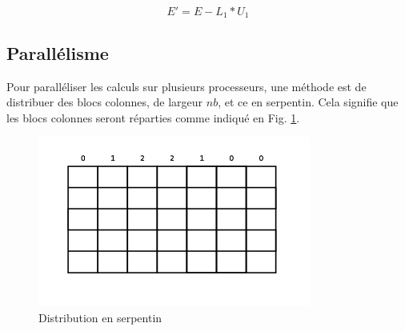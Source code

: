 \begin{equation}
\label{eq:dgemm}
E' = E - L_1 * U_1
\end{equation}

\subsection{Parallélisme} %
\label{sub:parallelisme}

Pour paralléliser les calculs sur plusieurs processeurs, une méthode est de distribuer des blocs colonnes, de largeur $nb$, et ce en serpentin. Cela signifie que les blocs colonnes seront réparties comme indiqué en Fig. \ref{fig:serpentin}.

\begin{figure}[H]
\centering
\includegraphics[width=0.8\textwidth]{serpentin}
\caption{Distribution en serpentin}
\label{fig:serpentin}
\end{figure}


